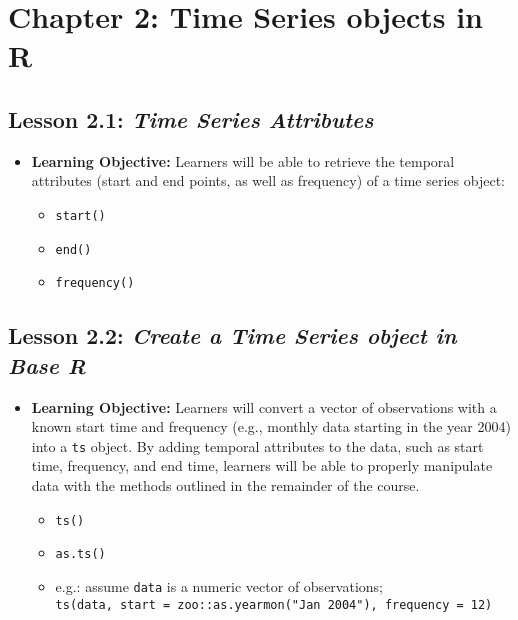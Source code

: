 \documentclass[
]{book}
\providecommand{\tightlist}{%
  \setlength{\itemsep}{0pt}\setlength{\parskip}{0pt}}
\begin{document}
\hypertarget{chapter-2-time-series-objects-in-r}{%
\section*{Chapter 2: Time Series objects in R}\label{chapter-2-time-series-objects-in-r}}

\hypertarget{lesson-2.1-time-series-attributes}{%
\subsection{\texorpdfstring{Lesson 2.1: \emph{Time Series Attributes}}{Lesson 2.1: Time Series Attributes}}\label{lesson-2.1-time-series-attributes}}

\begin{itemize}
\tightlist
\item
  \textbf{Learning Objective:} Learners will be able to retrieve the temporal attributes (start and end points, as well as frequency) of a time series object:

  \begin{itemize}
  \tightlist
  \item
    \texttt{start()}
  \item
    \texttt{end()}
  \item
    \texttt{frequency()}
  \end{itemize}
\end{itemize}

\hypertarget{lesson-2.2-create-a-time-series-object-in-base-r}{%
\subsection*{\texorpdfstring{Lesson 2.2: \emph{Create a Time Series object in Base R}}{Lesson 2.2: Create a Time Series object in Base R}}\label{lesson-2.2-create-a-time-series-object-in-base-r}}

\begin{itemize}
\tightlist
\item
  \textbf{Learning Objective:} Learners will convert a vector of observations with a known start time and frequency (e.g., monthly data starting in the year 2004) into a \texttt{ts} object. By adding temporal attributes to the data, such as start time, frequency, and end time, learners will be able to properly manipulate data with the methods outlined in the remainder of the course.

  \begin{itemize}
  \tightlist
  \item
    \texttt{ts()}
  \item
    \texttt{as.ts()}
  \item
    e.g.: assume \texttt{data} is a numeric vector of observations; \texttt{ts(data,\ start\ =\ zoo::as.yearmon("Jan\ 2004"),\ frequency\ =\ 12)}
  \end{itemize}
\end{itemize}
\end{document}
